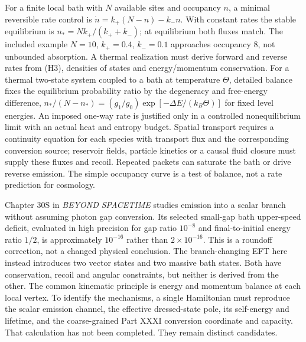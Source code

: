 \documentclass[
  11pt,
  twoside]{article}
\begin{document}
For a finite local bath with \(N\) available sites and occupancy \(n\),
a minimal reversible rate control is \(\dot n=k_+(N-n)-k_-n\). With
constant rates the stable equilibrium is \(n_*=Nk_+/(k_++k_-)\); at
equilibrium both fluxes match. The included example \(N=10\),
\(k_+=0.4\), \(k_-=0.1\) approaches occupancy 8, not unbounded
absorption. A thermal realization must derive forward and reverse rates
from (H3), densities of states and energy/momentum conservation. For a
thermal two-state system coupled to a bath at temperature \(\Theta\),
detailed balance fixes the equilibrium probability ratio by the
degeneracy and free-energy difference,
\(n_*/(N-n_*)=(g_1/g_0)\exp[-\Delta E/(k_B\Theta)]\) for fixed level
energies. An imposed one-way rate is justified only in a controlled
nonequilibrium limit with an actual heat and entropy budget. Spatial
transport requires a continuity equation for each species with transport
flux and the corresponding conversion source; reservoir fields, particle
kinetics or a causal fluid closure must supply these fluxes and recoil.
Repeated packets can saturate the bath or drive reverse emission. The
simple occupancy curve is a test of balance, not a rate prediction for
cosmology.

Chapter 30S in \emph{BEYOND SPACETIME} studies emission into a scalar
branch without assuming photon gap conversion. Its selected small-gap
bath upper-speed deficit, evaluated in high precision for gap ratio
\(10^{-8}\) and final-to-initial energy ratio \(1/2\), is approximately
\(10^{-16}\) rather than \(2\times10^{-16}\). This is a roundoff
correction, not a changed physical conclusion. The branch-changing EFT
here instead introduces two vector states and two massive bath states.
Both have conservation, recoil and angular constraints, but neither is
derived from the other. The common kinematic principle is energy and
momentum balance at each local vertex. To identify the mechanisms, a
single Hamiltonian must reproduce the scalar emission channel, the
effective dressed-state pole, its self-energy and lifetime, and the
coarse-grained Part XXXI conversion coordinate and capacity. That
calculation has not been completed. They remain distinct candidates.
\end{document}
